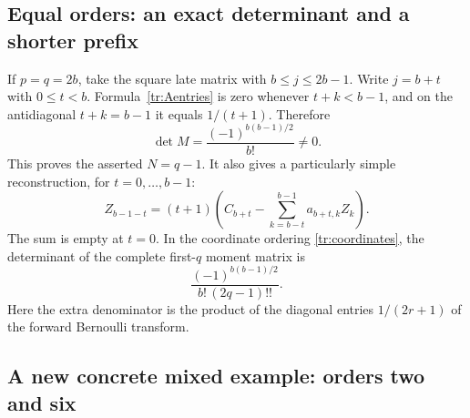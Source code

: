 \subsection{Equal orders: an exact determinant and a shorter prefix}

If $p=q=2b$, take the square late matrix with $b\le j\le2b-1$.
Write $j=b+t$ with $0\le t<b$. Formula~\eqref{tr:Aentries} is zero
whenever $t+k<b-1$, and on the antidiagonal $t+k=b-1$ it equals
$1/(t+1)$. Therefore
\begin{equation}\label{tr:diagonal-det}
 \det M=\frac{(-1)^{b(b-1)/2}}{b!}\ne0.
\end{equation}
This proves the asserted $N=q-1$. It also gives a particularly simple
reconstruction, for $t=0,\ldots,b-1$:
\begin{equation}\label{tr:diagonal-recursion}
 Z_{b-1-t}=(t+1)\left(
 C_{b+t}-\sum_{k=b-t}^{b-1}a_{b+t,k}Z_k\right).
\end{equation}
The sum is empty at $t=0$. In the coordinate ordering
\eqref{tr:coordinates}, the determinant of the complete first-$q$
moment matrix is
\begin{equation}\label{tr:complete-det}
 \frac{(-1)^{b(b-1)/2}}{b!\,(2q-1)!!}.
\end{equation}
Here the extra denominator is the product of the diagonal entries
$1/(2r+1)$ of the forward Bernoulli transform.

\subsection{A new concrete mixed example: orders two and six}

